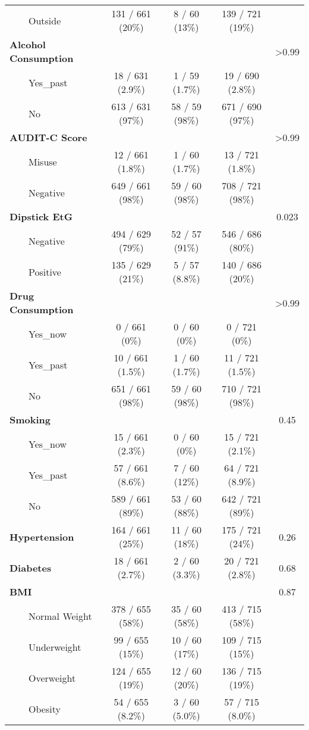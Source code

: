 \documentclass[
]{article}
\begin{document}
\begin{longtable}{lcccc}
    Outside & 131 / 661 (20\%) & 8 / 60 (13\%) & 139 / 721 (19\%) &  \\ 
\textbf{Alcohol Consumption} &  &  &  & >0.99 \\ 
    Yes\_past & 18 / 631 (2.9\%) & 1 / 59 (1.7\%) & 19 / 690 (2.8\%) &  \\ 
    No & 613 / 631 (97\%) & 58 / 59 (98\%) & 671 / 690 (97\%) &  \\ 
\textbf{AUDIT-C Score} &  &  &  & >0.99 \\ 
    Misuse & 12 / 661 (1.8\%) & 1 / 60 (1.7\%) & 13 / 721 (1.8\%) &  \\ 
    Negative & 649 / 661 (98\%) & 59 / 60 (98\%) & 708 / 721 (98\%) &  \\ 
\textbf{Dipstick EtG} &  &  &  & 0.023 \\ 
    Negative & 494 / 629 (79\%) & 52 / 57 (91\%) & 546 / 686 (80\%) &  \\ 
    Positive & 135 / 629 (21\%) & 5 / 57 (8.8\%) & 140 / 686 (20\%) &  \\ 
\textbf{Drug Consumption} &  &  &  & >0.99 \\ 
    Yes\_now & 0 / 661 (0\%) & 0 / 60 (0\%) & 0 / 721 (0\%) &  \\ 
    Yes\_past & 10 / 661 (1.5\%) & 1 / 60 (1.7\%) & 11 / 721 (1.5\%) &  \\ 
    No & 651 / 661 (98\%) & 59 / 60 (98\%) & 710 / 721 (98\%) &  \\ 
\textbf{Smoking} &  &  &  & 0.45 \\ 
    Yes\_now & 15 / 661 (2.3\%) & 0 / 60 (0\%) & 15 / 721 (2.1\%) &  \\ 
    Yes\_past & 57 / 661 (8.6\%) & 7 / 60 (12\%) & 64 / 721 (8.9\%) &  \\ 
    No & 589 / 661 (89\%) & 53 / 60 (88\%) & 642 / 721 (89\%) &  \\ 
\textbf{Hypertension} & 164 / 661 (25\%) & 11 / 60 (18\%) & 175 / 721 (24\%) & 0.26 \\ 
\textbf{Diabetes} & 18 / 661 (2.7\%) & 2 / 60 (3.3\%) & 20 / 721 (2.8\%) & 0.68 \\ 
\textbf{BMI} &  &  &  & 0.87 \\ 
    Normal Weight & 378 / 655 (58\%) & 35 / 60 (58\%) & 413 / 715 (58\%) &  \\ 
    Underweight & 99 / 655 (15\%) & 10 / 60 (17\%) & 109 / 715 (15\%) &  \\ 
    Overweight & 124 / 655 (19\%) & 12 / 60 (20\%) & 136 / 715 (19\%) &  \\ 
    Obesity & 54 / 655 (8.2\%) & 3 / 60 (5.0\%) & 57 / 715 (8.0\%) &  \\ 

\end{longtable}
\end{document}
